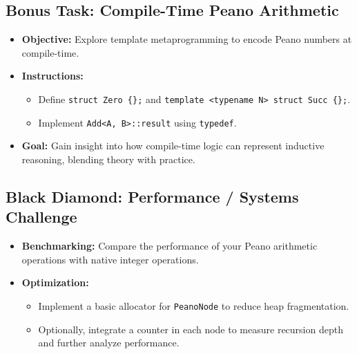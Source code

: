 \documentclass[12pt]{article}
\begin{document}
\subsection*{Bonus Task: Compile-Time Peano Arithmetic}
\begin{itemize}[leftmargin=*]
    \item \textbf{Objective:} Explore template metaprogramming to encode Peano numbers at compile-time.
    \item \textbf{Instructions:}
    \begin{itemize}
        \item Define \texttt{struct Zero \{\};} and \texttt{template <typename N> struct Succ \{\};}.
        \item Implement \texttt{Add<A, B>::result} using \texttt{typedef}.
    \end{itemize}
    \item \textbf{Goal:} Gain insight into how compile-time logic can represent inductive reasoning, blending theory with practice.
\end{itemize}

\subsection*{Black Diamond: Performance / Systems Challenge}
\begin{itemize}[leftmargin=*]
    \item \textbf{Benchmarking:} Compare the performance of your Peano arithmetic operations with native integer operations.
    \item \textbf{Optimization:}
    \begin{itemize}
        \item Implement a basic allocator for \texttt{PeanoNode} to reduce heap fragmentation.
        \item Optionally, integrate a counter in each node to measure recursion depth and further analyze performance.
    \end{itemize}
\end{itemize}
\end{document}

